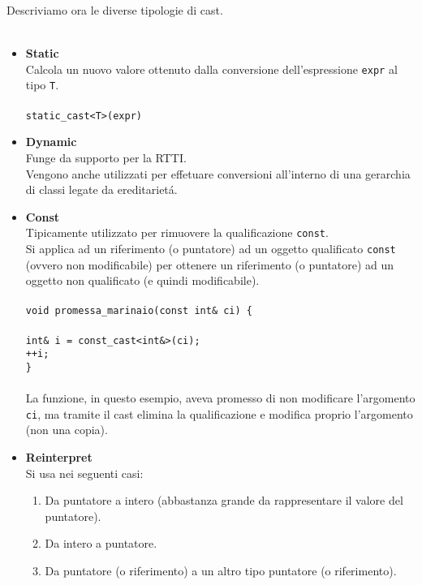 \documentclass{article}
\newcommand\tab[1][1cm]{\hspace*{#1}}
\begin{document}
Descriviamo ora le diverse tipologie di cast. \\ \\
\begin{itemize}
\item \textbf{\textcolor{blu}{Static}}\\Calcola un nuovo valore ottenuto dalla conversione dell'espressione \texttt{expr} al tipo \texttt{T}. \\ \\ \texttt{static\_cast<T>(expr)}\\
\item \textbf{\textcolor{blu}{Dynamic}}\\Funge da supporto per la RTTI.\\Vengono anche utilizzati per effetuare conversioni all'interno di una gerarchia di classi legate da ereditariet\'a.\\
\item \textbf{\textcolor{blu}{Const}}\\Tipicamente utilizzato per rimuovere la qualificazione \texttt{const}.\\ Si applica ad un riferimento (o puntatore) ad un oggetto qualificato \texttt{const} (ovvero non modificabile) per ottenere un riferimento (o puntatore) ad un oggetto non qualificato (e quindi modificabile).\\ \\ \texttt{void promessa\_marinaio(const int\& ci) \{ \\ \\ \tab int\& i = const\_cast<int\&>(ci); \\ \tab ++i; \\ \}} \\ \\La funzione, in questo esempio, aveva promesso di non modificare l'argomento \texttt{ci}, ma tramite il cast elimina la qualificazione e modifica proprio l'argomento (non una copia).\\
\item \textbf{\textcolor{blu}{Reinterpret}}\\Si usa nei seguenti casi: \\ \begin{enumerate} \item Da puntatore a intero (abbastanza grande da rappresentare il valore del puntatore). \\ \item Da intero a puntatore. \\ \item Da puntatore (o riferimento) a un altro tipo puntatore (o riferimento). \\ \end{enumerate}

\end{itemize}
\end{document}
